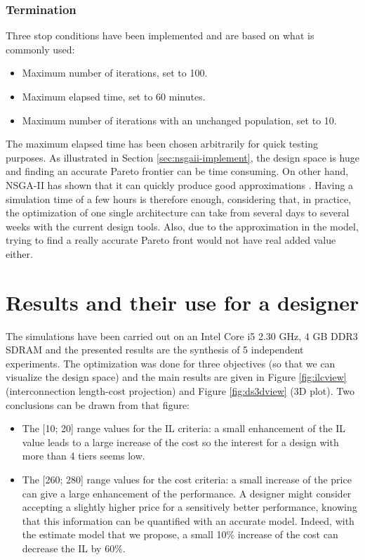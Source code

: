 \subsubsection{Termination}
Three stop conditions have been implemented and are based on what is commonly used:
\begin{itemize}
\item Maximum number of iterations, set to 100.
\item Maximum elapsed time, set to 60 minutes.
\item Maximum number of iterations with an unchanged population, set to 10.
\end{itemize}
The maximum elapsed time has been chosen arbitrarily for quick testing purposes. As illustrated in Section \ref{sec:nsgaii-implement}, the design space is huge and finding an accurate Pareto frontier can be time consuming. On other hand, NSGA-II has shown that it can quickly produce good approximations \cite{Deb00afast}. Having a simulation time of a few hours is therefore enough, considering that, in practice, the optimization of one single architecture can take from several days to several weeks with the current design tools. Also, due to the approximation in the model, trying to find a really accurate Pareto front would not have real added value either.

\section{Results and their use for a designer}
\label{sec:results}
The simulations have been carried out on an Intel Core i5 2.30 GHz, 4 GB
DDR3 SDRAM and the presented results are the synthesis of 5 independent experiments. The optimization was done for three objectives (so that we can visualize the design space) and the main results are given in Figure \ref{fig:ilcview} (interconnection length-cost projection) and Figure \ref{fig:ds3dview} (3D plot). Two conclusions can be drawn from that figure:
\begin{itemize}
\item The [10; 20] range values for the IL criteria: a small enhancement of the IL value leads to a large increase of the cost so the interest for a design with more than 4 tiers seems low.
\item The [260; 280] range values for the cost criteria: a small increase of the price can give a large enhancement of the performance. A designer might consider accepting a slightly higher price for a sensitively better performance, knowing that this information can be quantified with an accurate model. Indeed, with the estimate model that we propose, a small 10\% increase of the cost can decrease the IL by 60\%.
\end{itemize}

